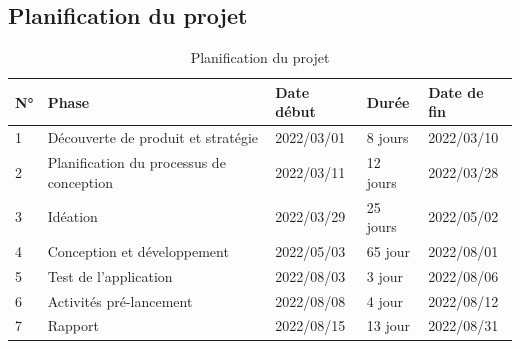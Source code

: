 \subsection{Planification du projet}
\begin{center}
	
		\begin{table}[h]
			
		\hspace*{-2cm}
		\begin{tabular}{|m{0.5cm}|m{6.5cm}|m{4cm}|m{3cm}|m{4cm}|}
			\hline
			\textbf{N°} &\textbf{Phase} & \textbf{Date début}&\textbf{Durée}& \textbf{Date de fin}
			\\
			\hline
			1
			&
			Découverte de produit et stratégie 
			&2022/03/01
			&8 jours
			&2022/03/10
			\\
			\hline
			2
			&
			Planification du processus de conception
			&2022/03/11
			&12 jours
			&2022/03/28
			\\
			\hline
			3
			&
			Idéation
			&2022/03/29
			&25 jours
			&2022/05/02
			\\
			\hline
			4
			&
			Conception et développement
			&2022/05/03
			&65 jour
			&2022/08/01
			\\
			\hline
			5
			&
			Test de l’application
			&2022/08/03
			&3 jour
			&2022/08/06
			\\
			\hline
			6
			&
			Activités pré-lancement
			&2022/08/08
			&4 jour
			&2022/08/12
			\\
			\hline
			7
			&	
			Rapport
			&2022/08/15
			&13 jour
			&2022/08/31
			\\
			\hline
		\end{tabular}
	
		\centering \caption{Planification du projet}
		\label{fig4:classT}
	\end{table}

	
	
	
	
	
	
	
	
	
	
	
	

\end{center}
